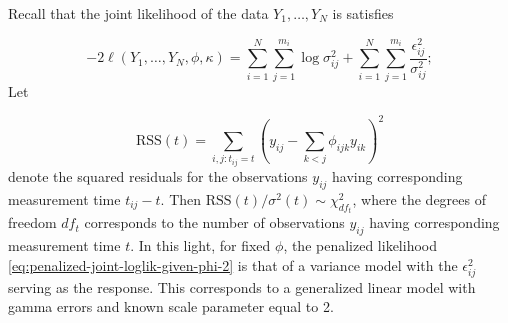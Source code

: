 

Recall that the joint likelihood of the data $Y_1,\dots, Y_N$ is satisfies

\begin{equation} \label{eq:penalized-joint-loglik-given-phi-2}
-2\ell\left( Y_1,\dots, Y_N, \phi, \kappa \right) =  \sum_{i = 1}^N \sum_{j = 1}^{m_i} \log \sigma^2_{ij}  + \sum_{i = 1}^N \sum_{j = 1}^{m_i} \frac {\epsilon_{ij}^2}{\sigma^2_{ij}};
\end{equation}
\noindent
Let 

\begin{equation}
\mbox{RSS}\left( t \right) = \sum_{i,j:t_{ij}= t} \left( y_{ij} - \sum_{k<j} \phi_{ijk} y_{ik}\right)^2
\end{equation}
\noindent
denote the squared residuals for the observations $y_{ij}$ having corresponding measurement time $t_{ij} - t$. Then $\mbox{RSS}\left( t \right)/\sigma^2\left(t\right) \sim \chi^2_{df_t}$, where the degrees of freedom $df_{t}$ corresponds to the number of observations $y_{ij}$ having corresponding measurement time $t$. In this light, for fixed $\phi$, the penalized likelihood \ref{eq:penalized-joint-loglik-given-phi-2} is that of a variance model with the $\epsilon_{ij}^2$ serving as the response. This corresponds to a generalized linear model with gamma errors and known scale parameter equal to 2.



